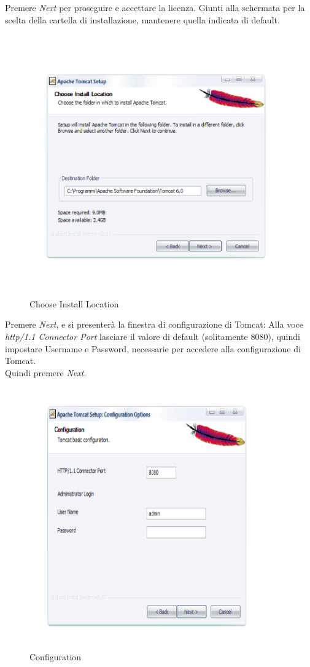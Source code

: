 Premere \textit{Next} per proseguire e accettare la licenza.
Giunti alla schermata per la scelta della cartella di installazione, mantenere quella indicata di default.

\begin{figure}[!ht]
\centering
\includegraphics[scale=0.7]{images/InstallTomcat2.png}
\caption{Choose Install Location}
\end{figure} 
\newpage

Premere \textit{Next}, e si presenter\`a la finestra di configurazione di Tomcat:
Alla voce \textit{http/1.1 Connector Port} lasciare il valore di default (solitamente 8080), quindi impostare Username e Password, necessarie per accedere alla configurazione di Tomcat.\\
Quindi premere \textit{Next}.

\begin{figure}[!ht]
\centering
\includegraphics[scale=0.7]{images/InstallTomcat3.png}
\caption{Configuration}
\end{figure} 

